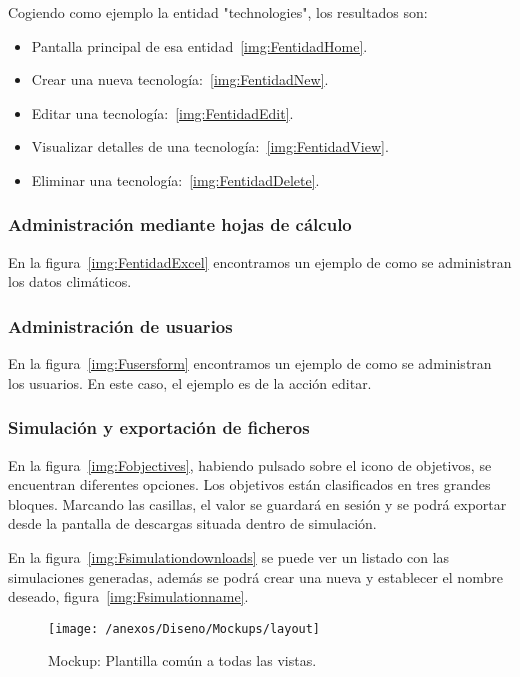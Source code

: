Cogiendo como ejemplo la entidad "technologies", los resultados son: 

\begin{itemize}
	\item Pantalla principal de esa entidad~\ref{img:FentidadHome}.
	\item Crear una nueva tecnología:~\ref{img:FentidadNew}.
	\item Editar una tecnología:~\ref{img:FentidadEdit}.
	\item Visualizar detalles de una tecnología:~\ref{img:FentidadView}.
	\item Eliminar una tecnología:~\ref{img:FentidadDelete}.
\end{itemize}

\subsubsection{Administración mediante hojas de cálculo} 

En la figura~\ref{img:FentidadExcel} encontramos un ejemplo de como se administran los datos climáticos. 

\subsubsection{Administración de usuarios} 

En la figura~\ref{img:Fusersform} encontramos un ejemplo de como se administran los usuarios. En este caso, el ejemplo es de la acción editar. 

\subsubsection{Simulación y exportación de ficheros} 

En la figura~\ref{img:Fobjectives}, habiendo pulsado sobre el icono de objetivos, se encuentran diferentes opciones. Los objetivos están clasificados en tres grandes bloques. Marcando las casillas, el valor se guardará en sesión y se podrá exportar desde la pantalla de descargas situada dentro de simulación.

En la figura~\ref{img:Fsimulationdownloads} se puede ver un listado con las simulaciones generadas, además se podrá crear una nueva y establecer el nombre deseado, figura~\ref{img:Fsimulationname}.


\begin{figure}[h]
	\centering
	\texttt{[image: /anexos/Diseno/Mockups/layout]}
	\caption{Mockup: Plantilla común a todas las vistas.}
	\label{img:layout}
\end{figure}

